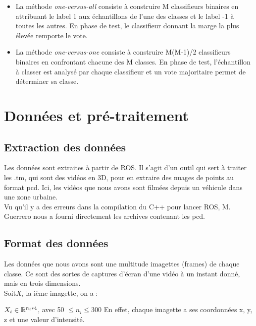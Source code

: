 	\begin{itemize}
	\item La méthode \emph{one-versus-all} consiste à construire M classifieurs binaires en attribuant le label 1 aux échantillons de l'une des classes et le label -1 à toutes les autres. En phase de test, le classifieur donnant la marge la plus élevée remporte le vote.
	\item La méthode \emph{one-versus-one} consiste à construire M(M-1)/2 classifieurs binaires en confrontant chacune des M classes. En phase de test, l'échantillon à classer est analysé par chaque classifieur et un vote majoritaire permet de déterminer sa classe.\\
	\end{itemize}


\section{Données et pré-traitement}
\subsection{Extraction des données}

	Les données sont extraites à partir de ROS. Il s'agit d'un outil qui sert à traiter les .tm, qui sont des vidéos en 3D, pour en extraire des nuages de points au format pcd. Ici, les vidéos que nous avons sont filmées depuis un véhicule dans une zone urbaine.\\

	Vu qu’il y a des erreurs dans la compilation du C++ pour lancer ROS, M. Guerrero nous a fourni directement les archives contenant les pcd.\\

\subsection{Format des données}

	Les données que nous avons sont une multitude imagettes (frames) de chaque classe. Ce sont des sortes de captures d'écran d'une vidéo à un instant donné, mais en trois dimensions.\\

	Soit$ X_{i}$ la ième imagette, on a :

	$  X_{i} \in \mathbb{R}^{n_{i}*4} $, avec 50 $\leq n_{i} \leq 300$
	En effet, chaque imagette a ses coordonnées x, y, z et une valeur d'intensité. \\ 

